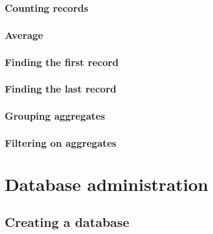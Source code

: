 \documentclass[12pt]{article} %
\begin{document}

\subsubsection{Counting records} %


\subsubsection{Average} %


\subsubsection{Finding the first record} %


\subsubsection{Finding the last record} %


\subsubsection{Grouping aggregates} %


\subsubsection{Filtering on aggregates} %


\section{Database administration} %


\subsection{Creating a database} %
\end{document}
